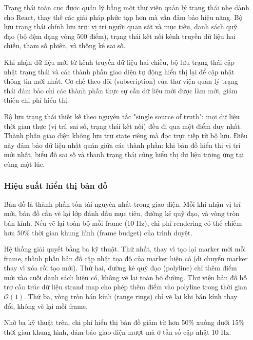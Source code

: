 \hspace{0.5cm} Trạng thái toàn cục được quản lý bằng một thư viện quản lý trạng thái nhẹ dành cho React, thay thế các giải pháp phức tạp hơn mà vẫn đảm bảo hiệu năng. Bộ lưu trạng thái chính lưu trữ: vị trí người quan sát và mục tiêu, danh sách quỹ đạo (bộ đệm dạng vòng 500 điểm), trạng thái kết nối kênh truyền dữ liệu hai chiều, tham số phiên, và thống kê sai số.

Khi nhận dữ liệu mới từ kênh truyền dữ liệu hai chiều, bộ lưu trạng thái cập nhật trạng thái và các thành phần giao diện tự động hiển thị lại để cập nhật thông tin mới nhất. Cơ chế theo dõi (subscription) của thư viện quản lý trạng thái đảm bảo chỉ các thành phần thực sự cần dữ liệu mới được làm mới, giảm thiểu chi phí hiển thị.

Bộ lưu trạng thái thiết kế theo nguyên tắc "single source of truth": mọi dữ liệu thời gian thực (vị trí, sai số, trạng thái kết nối) đều đi qua một điểm duy nhất. Thành phần giao diện không lưu trữ state riêng mà đọc trực tiếp từ bộ lưu. Điều này đảm bảo dữ liệu nhất quán giữa các thành phần: khi bản đồ hiển thị vị trí mới nhất, biểu đồ sai số và thanh trạng thái cũng hiển thị dữ liệu tương ứng tại cùng một lúc.

\subsubsection{Hiệu suất hiển thị bản đồ}

\hspace{0.5cm} Bản đồ là thành phần tốn tài nguyên nhất trong giao diện. Mỗi khi nhận vị trí mới, bản đồ cần vẽ lại lớp đánh dấu mục tiêu, đường kẻ quỹ đạo, và vòng tròn bán kính. Nếu vẽ lại toàn bộ mỗi frame (10 Hz), chi phí rendering có thể chiếm hơn 50\% thời gian khung hình (frame budget) của trình duyệt.

Hệ thống giải quyết bằng ba kỹ thuật. Thứ nhất, thay vì tạo lại marker mới mỗi frame, thành phần bản đồ cập nhật tọa độ của marker hiện có (di chuyển marker thay vì xóa rồi tạo mới). Thứ hai, đường kẻ quỹ đạo (polyline) chỉ thêm điểm mới vào cuối danh sách hiện có, không vẽ lại toàn bộ đường. Thư viện bản đồ hỗ trợ cấu trúc dữ liệu strand map cho phép thêm điểm vào polyline trong thời gian $\mathcal{O}(1)$. Thứ ba, vòng tròn bán kính (range rings) chỉ vẽ lại khi bán kính thay đổi, không vẽ lại mỗi frame.

Nhờ ba kỹ thuật trên, chi phí hiển thị bản đồ giảm từ hơn 50\% xuống dưới 15\% thời gian khung hình, đảm bảo giao diện mượt mà ở tần số cập nhật 10 Hz.

